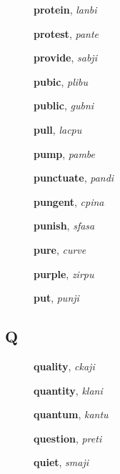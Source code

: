 \documentclass[12pt]{book}
\begin{document}
\begin{description}
\item[ ] \textbf{protein}, \textit{lanbi}

\item[ ] \textbf{protest}, \textit{pante}

\item[ ] \textbf{provide}, \textit{sabji}

\item[ ] \textbf{pubic}, \textit{plibu}

\item[ ] \textbf{public}, \textit{gubni}

\item[ ] \textbf{pull}, \textit{lacpu}

\item[ ] \textbf{pump}, \textit{pambe}

\item[ ] \textbf{punctuate}, \textit{pandi}

\item[ ] \textbf{pungent}, \textit{cpina}

\item[ ] \textbf{punish}, \textit{sfasa}

\item[ ] \textbf{pure}, \textit{curve}

\item[ ] \textbf{purple}, \textit{zirpu}

\item[ ] \textbf{put}, \textit{punji}

\end{description}



\subsection{Q} %

\begin{description}

\item[ ] \textbf{quality}, \textit{ckaji}

\item[ ] \textbf{quantity}, \textit{klani}

\item[ ] \textbf{quantum}, \textit{kantu}

\item[ ] \textbf{question}, \textit{preti}

\item[ ] \textbf{quiet}, \textit{smaji}



\end{description}
\end{document}
